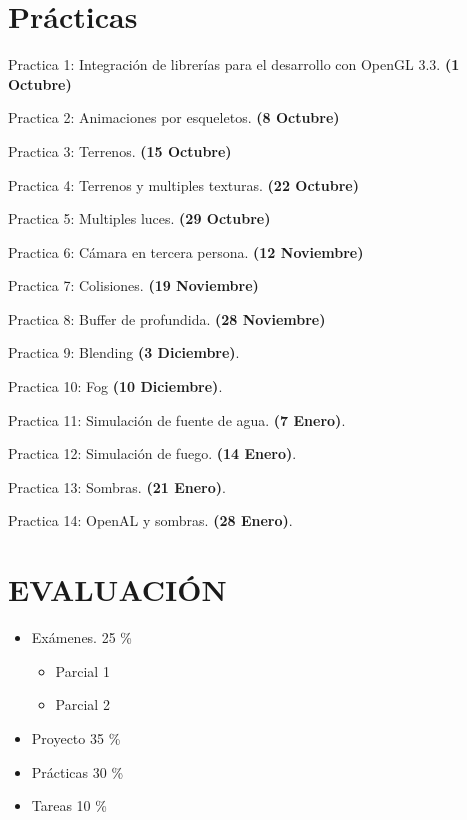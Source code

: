 \documentclass[a4paper,11pt]{article}
\theoremstyle{mytheor}
\begin{document}
\section*{Prácticas}
\begin{legal}
	\item Practica 1: Integración de librerías para el desarrollo con OpenGL 3.3. \textbf{(1 Octubre)}
	\item Practica 2: Animaciones por esqueletos. \textbf{(8 Octubre)}
	\item Practica 3: Terrenos. \textbf{(15 Octubre)}
	\item Practica 4: Terrenos y multiples texturas. \textbf{(22 Octubre)}
	\item Practica 5: Multiples luces. \textbf{(29 Octubre)}
	\item Practica 6: Cámara en tercera persona. \textbf{(12 Noviembre)}
	\item Practica 7: Colisiones. \textbf{(19 Noviembre)}
	\item Practica 8: Buffer de profundida. \textbf{(28 Noviembre)}
	\item Practica 9: Blending \textbf{(3 Diciembre)}.
	\item Practica 10: Fog \textbf{(10 Diciembre)}.
	\item Practica 11: Simulación de fuente de agua. \textbf{(7 Enero)}.
	\item Practica 12: Simulación de fuego. \textbf{(14 Enero)}.
	\item Practica 13: Sombras. \textbf{(21 Enero)}.
	\item Practica 14: OpenAL y sombras. \textbf{(28 Enero)}.
\end{legal}


\section*{EVALUACIÓN}

\begin{itemize}
	\item Exámenes.	25 \%
	\begin{itemize}
		\item Parcial 1
		\item Parcial 2
	\end{itemize}
	\item Proyecto 35 \%
	\item Prácticas 30 \%
	\item Tareas 10 \%
\end{itemize}
\end{document}

